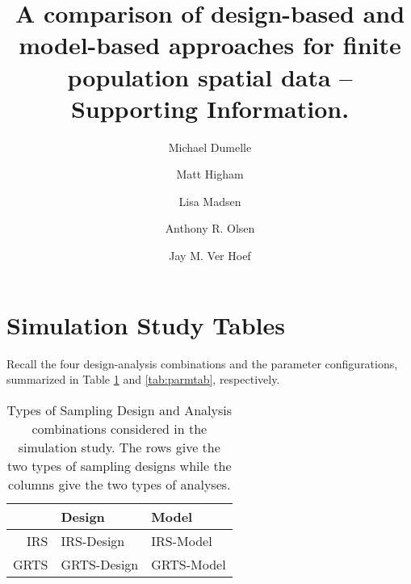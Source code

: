\documentclass[]{elsarticle} %
\begin{document}
\begin{frontmatter}

  \title{A comparison of design-based and model-based approaches for finite
population spatial data -- Supporting Information.}
    \author[USEPA]{Michael Dumelle}
  
    \author[STLAW]{Matt Higham}
  
    \author[OSU]{Lisa Madsen}
  
    \author[USEPA]{Anthony R. Olsen}
  
    \author[NOAA]{Jay M. Ver Hoef}
  
      \address[USEPA]{United States Environmental Protection Agency, 200 SW 35th St,
Corvallis, Oregon, 97333}
    \address[STLAW]{Saint Lawrence University Department of Mathematics, Computer Science,
and Statistics, 23 Romoda Drive, Canton, New York, 13617}
    \address[OSU]{Oregon State University Department of Statistics, 239 Weniger Hall,
Corvallis, Oregon, 97331}
    \address[NOAA]{Marine Mammal Laboratory, Alaska Fisheries Science Center, National
Oceanic and Atmospheric Administration, Seattle, Washington, 98115}
  
  \begin{abstract}
  
  \end{abstract}
  
 \end{frontmatter}

\hypertarget{sec:simtabs}{%
\section{Simulation Study Tables}\label{sec:simtabs}}

Recall the four design-analysis combinations and the parameter
configurations, summarized in Table \ref{tab:designanalysis} and
\ref{tab:parmtab}, respectively.

\begin{table}[ht]
\centering
\begin{tabular}{r|ll}
  \hline
 & Design & Model \\ 
  \hline
IRS & IRS-Design & IRS-Model \\ 
  GRTS & GRTS-Design & GRTS-Model \\ 
   \hline
\end{tabular}
\caption{\label{tab:designanalysis} Types of Sampling Design and Analysis combinations considered in the simulation study. The rows give the two types of sampling designs while the columns give the two types of analyses.} 
\end{table}
\end{document}
